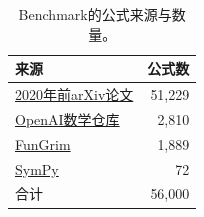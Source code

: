 \begin{table}[H]\centering\small
\caption{Benchmark的公式来源与数量。}\label{tab:sources}
\begin{tabularx}{\columnwidth}{Yr}\toprule 来源&公式数\\\midrule
\href{https://arxiv.org/}{2020年前arXiv论文}&51,229\\
\href{https://github.com/openai/math}{OpenAI数学仓库}&2,810\\
\href{https://github.com/fredrik-johansson/fungrim}{FunGrim}&1,889\\
\href{https://github.com/sympy/sympy}{SymPy}&72\\\midrule
合计&56,000\\\bottomrule\end{tabularx}\end{table}
